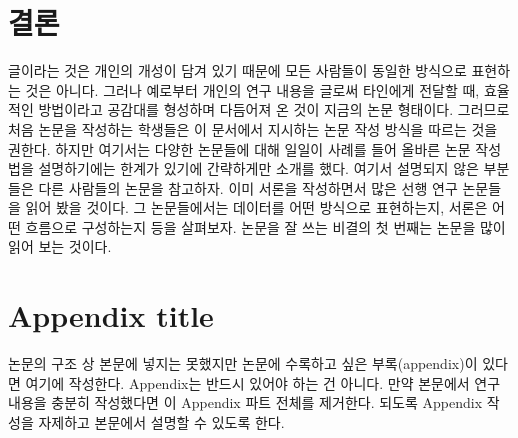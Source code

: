 \documentclass[twoside,11pt]{gshs_thesis}
\begin{document}

\section{결론}
글이라는 것은 개인의 개성이 담겨 있기 때문에 모든 사람들이 동일한 방식으로 표현하는 것은 아니다. 그러나 예로부터 개인의 연구 내용을 글로써 타인에게 전달할 때, 효율적인 방법이라고 공감대를 형성하며 다듬어져 온 것이 지금의 논문 형태이다. 그러므로 처음 논문을 작성하는 학생들은 이 문서에서 지시하는 논문 작성 방식을 따르는 것을 권한다. 하지만 여기서는 다양한 논문들에 대해 일일이 사례를 들어 올바른 논문 작성법을 설명하기에는 한계가 있기에 간략하게만 소개를 했다. 여기서 설명되지 않은 부분들은 다른 사람들의 논문을 참고하자. 이미 서론을 작성하면서 많은 선행 연구 논문들을 읽어 봤을 것이다. 그 논문들에서는 데이터를 어떤 방식으로 표현하는지, 서론은 어떤 흐름으로 구성하는지 등을 살펴보자. 논문을 잘 쓰는 비결의 첫 번째는 논문을 많이 읽어 보는 것이다.


\clearpage  %
\appendix
\renewcommand{\thesection}{\Alph{section}} %
\renewcommand{\theequation}{\thesection.\arabic{equation}} %
\renewcommand{\thefigure}{\thesection-\arabic{figure}} %
\renewcommand{\thetable}{\thesection-\arabic{table}} %
\setcounter{equation}{0} %
\setcounter{figure}{0} %
\setcounter{table}{0} %

\section{Appendix title}
논문의 구조 상 본문에 넣지는 못했지만 논문에 수록하고 싶은 부록(appendix)이 있다면 여기에 작성한다. Appendix는 반드시 있어야 하는 건 아니다. 만약 본문에서 연구 내용을 충분히 작성했다면 이 Appendix 파트 전체를 제거한다. 되도록 Appendix 작성을 자제하고 본문에서 설명할 수 있도록 한다.
\end{document}

